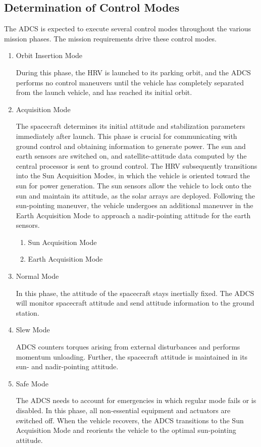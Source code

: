 \documentclass[paper=letter, fontsize=11pt]{scrartcl} %
\numberwithin{equation}{section} %
\numberwithin{figure}{section} %
\numberwithin{table}{section} %
\begin{document}
\subsection{Determination of Control Modes}
The ADCS is expected to execute several control modes throughout the various mission phases. The mission requirements drive these control modes.
\begin{enumerate}
\item Orbit Insertion Mode
\par During this phase, the HRV is launched to its parking orbit, and the ADCS performs no control maneuvers until the vehicle has completely separated from the launch vehicle, and has reached its initial orbit.
\item Acquisition Mode
\par The spacecraft determines its initial attitude and stabilization parameters immediately after launch. This phase is crucial for communicating with ground control and obtaining information to generate power. The sun and earth sensors are switched on, and satellite-attitude data computed by the central processor is sent to ground control. The HRV subsequently transitions into the Sun Acquisition Modes, in which the vehicle is oriented toward the sun for power generation. The sun sensors allow the vehicle to lock onto the sun and maintain its attitude, as the solar arrays are deployed. Following the sun-pointing maneuver, the vehicle undergoes an additional maneuver in the Earth Acquisition Mode to approach a nadir-pointing attitude for the earth sensors.
    \begin{enumerate}
    \item Sun Acquisition Mode
    \item Earth Acquisition Mode
    \end{enumerate}
\item Normal Mode
\par In this phase, the attitude of the spacecraft stays inertially fixed. The ADCS will monitor spacecraft attitude and send attitude information to the ground station.
\item Slew Mode
\par ADCS counters torques arising from external disturbances and performs momentum unloading. Further, the spacecraft attitude is maintained in its sun- and nadir-pointing attitude.
\item Safe Mode
\par The ADCS needs to account for emergencies in which regular mode fails or is disabled. In this phase, all non-essential equipment and actuators are switched off. When the vehicle recovers, the ADCS transitions to the Sun Acquisition Mode and reorients the vehicle to the optimal sun-pointing attitude.
\end{enumerate}
\end{document}

